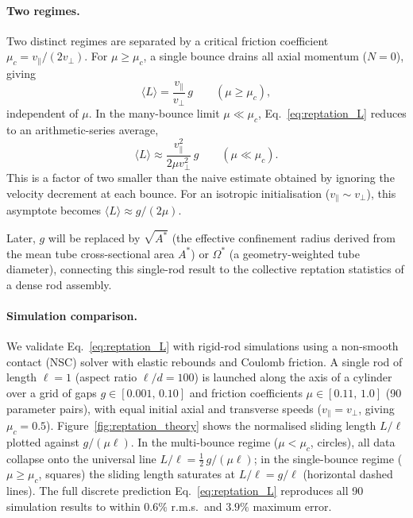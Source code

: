 \paragraph{Two regimes.}
Two distinct regimes are separated by a critical friction coefficient
$\mu_c = v_\parallel/(2v_\perp)$.  For $\mu \geq \mu_c$, a single bounce
drains all axial momentum ($N=0$), giving
%
\begin{equation}
  \langle L \rangle = \frac{v_\parallel}{v_\perp}\,g
  \qquad (\mu \geq \mu_c),
  \label{eq:reptation_single}
\end{equation}
%
independent of $\mu$.  In the many-bounce limit $\mu \ll \mu_c$,
Eq.~\eqref{eq:reptation_L} reduces to an arithmetic-series average,
%
\begin{equation}
  \langle L \rangle \approx \frac{v_\parallel^2}{2\mu v_\perp^2}\,g
  \qquad (\mu \ll \mu_c).
  \label{eq:reptation_multi}
\end{equation}
%
This is a factor of two smaller than the naive estimate obtained by ignoring
the velocity decrement at each bounce.  For an isotropic initialisation
($v_\parallel \sim v_\perp$), this asymptote becomes
$\langle L \rangle \approx g/(2\mu)$.

Later, $g$ will be replaced by $\sqrt{A^*}$ (the effective confinement radius
derived from the mean tube cross-sectional area $A^*$) or $\Omega^*$ (a
geometry-weighted tube diameter), connecting this single-rod result to the
collective reptation statistics of a dense rod assembly.

\paragraph{Simulation comparison.}
We validate Eq.~\eqref{eq:reptation_L} with rigid-rod simulations using a
non-smooth contact (NSC) solver with elastic rebounds and Coulomb friction.  A
single rod of length $\ell=1$ (aspect ratio $\ell/d=100$) is launched along
the axis of a cylinder over a grid of gaps
$g \in [0.001,\,0.10]$ and friction coefficients $\mu \in [0.11,\,1.0]$
(90 parameter pairs), with equal initial axial and transverse speeds
($v_\parallel = v_\perp$, giving $\mu_c = 0.5$).
Figure~\ref{fig:reptation_theory} shows the normalised sliding length
$L/\ell$ plotted against $g/(\mu\ell)$.  In the multi-bounce regime
($\mu < \mu_c$, circles), all data collapse onto the universal line
$L/\ell = \tfrac{1}{2}\,g/(\mu\ell)$; in the single-bounce regime
($\mu \geq \mu_c$, squares) the sliding length saturates at $L/\ell = g/\ell$
(horizontal dashed lines).  The full discrete prediction
Eq.~\eqref{eq:reptation_L} reproduces all 90 simulation results to within
$0.6\%$ r.m.s.\ and $3.9\%$ maximum error.

